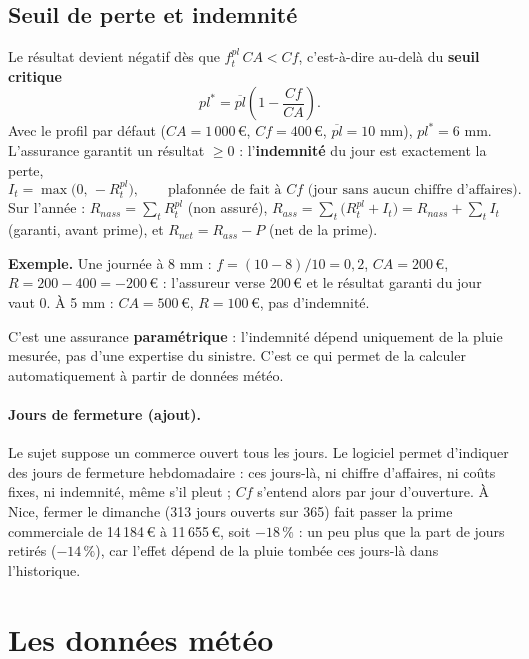 \documentclass[11pt,a4paper]{article}
\newcommand{\eur}[1]{#1\,€}
\newcommand{\plbar}{\overline{pl}}
\begin{document}
\subsection{Seuil de perte et indemnité}
Le résultat devient négatif dès que $f_t^{pl}\,CA < Cf$, c'est-à-dire au-delà du \textbf{seuil critique}
\[
pl^{*} = \plbar\left(1 - \frac{Cf}{CA}\right).
\]
Avec le profil par défaut ($CA = \eur{1\,000}$, $Cf = \eur{400}$, $\plbar = 10$ mm), $pl^* = 6$ mm.
L'assurance garantit un résultat $\ge 0$ : l'\textbf{indemnité} du jour est exactement la perte,
\[
I_t = \max\big(0,\,-R_t^{pl}\big), \qquad \text{plafonnée de fait à } Cf \text{ (jour sans aucun chiffre d'affaires).}
\]
Sur l'année : $R_{nass} = \sum_t R_t^{pl}$ (non assuré), $R_{ass} = \sum_t \big(R_t^{pl} + I_t\big) = R_{nass} + \sum_t I_t$
(garanti, avant prime), et $R_{net} = R_{ass} - P$ (net de la prime).

\begin{encadre}
\textbf{Exemple.} Une journée à 8 mm : $f = (10-8)/10 = 0{,}2$, $CA = \eur{200}$, $R = 200 - 400 = \eur{-200}$ :
l'assureur verse \eur{200} et le résultat garanti du jour vaut 0. À 5 mm : $CA = \eur{500}$, $R = \eur{100}$, pas d'indemnité.
\end{encadre}

C'est une assurance \textbf{paramétrique} : l'indemnité dépend uniquement de la pluie mesurée, pas d'une expertise
du sinistre. C'est ce qui permet de la calculer automatiquement à partir de données météo.

\paragraph{Jours de fermeture (ajout).} Le sujet suppose un commerce ouvert tous les jours. Le logiciel permet
d'indiquer des jours de fermeture hebdomadaire : ces jours-là, ni chiffre d'affaires, ni coûts fixes, ni indemnité,
même s'il pleut ; $Cf$ s'entend alors par jour d'ouverture. À Nice, fermer le dimanche (313 jours ouverts sur 365)
fait passer la prime commerciale de \eur{14\,184} à \eur{11\,655}, soit $-18\,\%$ : un peu plus que la part de jours
retirés ($-14\,\%$), car l'effet dépend de la pluie tombée ces jours-là dans l'historique.

\section{Les données météo}
\end{document}
